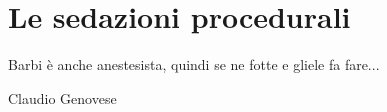 \chapter{Le sedazioni procedurali}

\epigraph{Barbi è anche anestesista, quindi se ne fotte e gliele fa fare...}{Claudio Genovese}

\lipsum